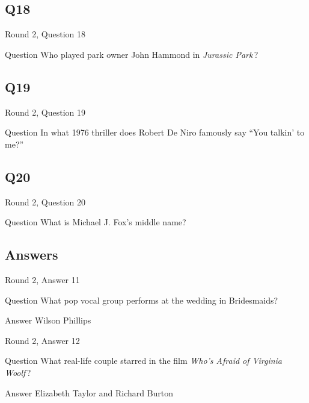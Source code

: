 \documentclass[11pt]{beamer}
\begin{document}
\subsection*{Q18}
\begin{frame}[t]{Round 2, Question 18}
\vspace{2em}
\begin{block}{Question}
Who played park owner John Hammond in \emph{Jurassic Park}\,?
\end{block}
\end{frame}
    

\subsection*{Q19}
\begin{frame}[t]{Round 2, Question 19}
\vspace{2em}
\begin{block}{Question}
In what 1976 thriller does Robert De Niro famously say ``You talkin' to me?''
\end{block}
\end{frame}
    

\subsection*{Q20}
\begin{frame}[t]{Round 2, Question 20}
\vspace{2em}
\begin{block}{Question}
What is Michael J. Fox's middle name?
\end{block}
\end{frame}
    
\subsection{Answers}

\begin{frame}[t]{Round 2, Answer 11}
\vspace{2em}
\begin{block}{Question}
What pop vocal group performs at the wedding in Bridesmaids?
\end{block}
\pause{}
\begin{block}{Answer}
Wilson Phillips
\end{block}
\end{frame}
    

\begin{frame}[t]{Round 2, Answer 12}
\vspace{2em}
\begin{block}{Question}
What real-life couple starred in the film \emph{Who's Afraid of Virginia Woolf}\,?
\end{block}
\pause{}
\begin{block}{Answer}
Elizabeth Taylor and Richard Burton
\end{block}
\end{frame}
    
\end{document}
